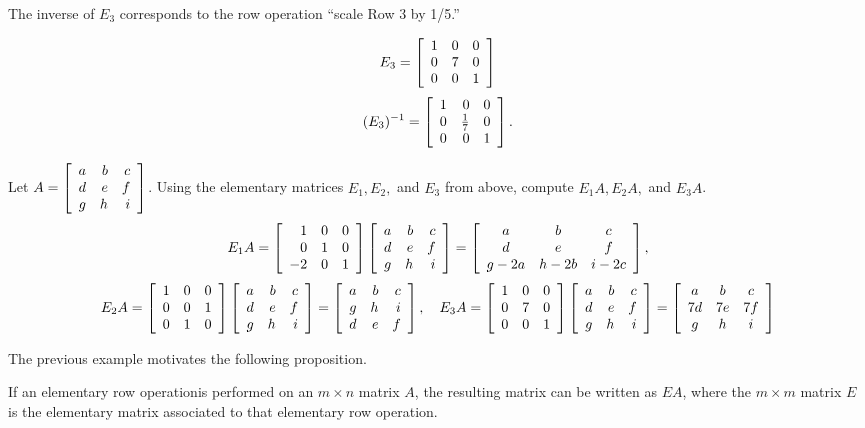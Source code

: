 \begin{enumerate}[!LIST!, start=1]
\begin{multicols}{2}
The inverse of $E_3$ corresponds to the row operation ``scale Row 3 by 1/5.''
\end{multicols}\vspace{-0.45 in}
\begin{multicols}{2}
\[E_3 = \mtx{rrr}{1&0&0\\0&7&0\\0&0&1}\]  \columnbreak
\vfill
\[(E_3)^{-1} = \mtx{rrr}{1&0&0\\0&\frac{1}{7}&0\\0&0&1}.\]
\mbox{}
\end{multicols}
\end{enumerate}\vs

\begin{Exam} Let $A = \mtx{rrr}{a&b&c\\d&e&f\\g&h&i}$.  Using the elementary matrices $E_1, E_2,$ and $E_3$ from above, compute $E_1A, E_2A,$ and $E_3A$.
\[E_1A =  \mtx{rrr}{1&0&0\\0&1&0\\-2&0&1} \mtx{rrr}{a&b&c\\d&e&f\\g&h&i} =  \mtx{ccc}{a&b&c\\d&e&f\\g-2a&h-2b&i-2c}, \]
\[E_2A = \mtx{rrr}{1&0&0\\0&0&1\\0&1&0}\mtx{rrr}{a&b&c\\d&e&f\\g&h&i} = \mtx{rrr}{a&b&c\\g&h&i\\d&e&f}, \quad E_3A = \mtx{rrr}{1&0&0\\0&7&0\\0&0&1}\mtx{rrr}{a&b&c\\d&e&f\\g&h&i} = \mtx{ccc}{a&b&c\\7d&7e&7f\\g&h&i}\]
\end{Exam}\vs

The previous example motivates the following proposition.\\

\begin{Prop} If an elementary row operation\footnotemark[2] is performed on an $m\times n$ matrix $A$, the resulting matrix can be written as $EA$, where the $m\times m$ matrix $E$ is the elementary matrix associated to that elementary row operation.
\end{Prop}\vs

